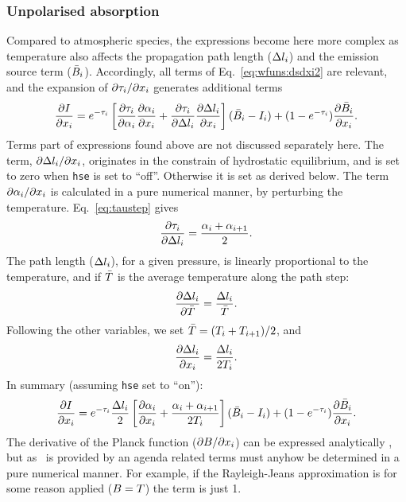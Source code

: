 \subsubsection{Unpolarised absorption}
%
Compared to atmospheric species, the expressions become here more complex as
temperature also affects the propagation path length ($\Delta l_{i}$)
and the emission source term ($\bar{B}_i$). Accordingly, all terms of
Eq.~\ref{eq:wfuns:dsdxi2} are relevant, and the expansion of
$\partial\tau_{i}/\partial x_{i}$ generates additional terms
\begin{equation}
  \frac{\partial I}{\partial x_{i}} =
   e^{-\tau_{i}}\left[
      \frac{\partial\tau_{i}}{\partial{\alpha}_{i}}
      \frac{\partial{\alpha}_{i}}{\partial x_{i}} + 
      \frac{\partial\tau_{i}}{\partial\Delta l_{i}}
     \frac{\partial\Delta l_{i}}{\partial x_{i}}
  \right](\bar{B}_i-I_{i})+
  (1-e^{-\tau_{i}})\frac{\partial\bar{B}_i}{\partial x_{i}}.  
\end{equation}
Terms part of expressions found above are not discussed separately here. The
term, $\partial\Delta l_{i}/\partial x_{i}$, originates in the
constrain of hydrostatic equilibrium, and is set to zero when \verb|hse| 
is set to ``off''. Otherwise it is set as derived below.
The term $\partial{\alpha}_{i}/\partial x_{i}$ is calculated in a pure
numerical manner, by perturbing the temperature. Eq.~\ref{eq:taustep} gives
\begin{equation}
  \frac{\partial \tau_{i}}{\partial \Delta l_{i}} = 
  \frac{{\alpha}_{i}+{\alpha}_{i+1}}{2}. 
\end{equation}
The path length ($\Delta l_{i}$), for a given pressure, is linearly
proportional to the temperature, and if $\bar{T}$ is the average temperature
along the path step:
\begin{equation}
  \frac{\partial \Delta l_{i}}{\partial \bar{T}} =   
                                    \frac{\Delta l_{i}}{\bar{T}}.
  \label{eq:wfuns:ddldtbar}
\end{equation}
Following the other variables, we set $\bar{T}=(T_{i}+T_{i+1})/2$, and
\begin{equation}
  \frac{\partial \Delta l_{i}}{\partial x_{i}} = 
                                    \frac{\Delta l_{i}}{2T_{i}}.
  \label{eq:wfuns:ddldti}
\end{equation}
In summary (assuming \verb|hse| set to ``on''):
\begin{equation}
  \frac{\partial I}{\partial x_{i}} =
   e^{-\tau_{i}}\frac{\Delta l_{i}}{2}\left[
      \frac{\partial{\alpha}_{i}}{\partial x_{i}} + 
  \frac{{\alpha}_{i}+{\alpha}_{i+1}}{2T_{i}}
  \right](\bar{B}_i-I_{i})+
  (1-e^{-\tau_{i}})\frac{\partial\bar{B}_i}{\partial x_{i}}.  
\end{equation}
The derivative of the Planck function ($\partial B/\partial x_{i}$) can
be expressed analytically \citep{eriksson:studi:02}, but as \Planck\ is
provided by an agenda related terms must anyhow be determined in a pure
numerical manner. For example, if the Rayleigh-Jeans approximation is for some
reason applied ($B=T$) the term is just 1.

